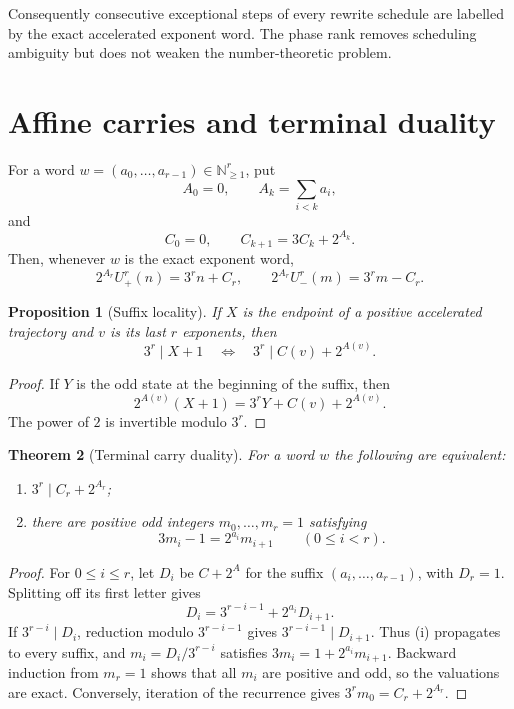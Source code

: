 \documentclass[11pt,reqno]{amsart}
\newtheorem{theorem}{Theorem}[section]
\newtheorem{proposition}[theorem]{Proposition}
\theoremstyle{remark}
\newcommand{\N}{\mathbb N}
\newcommand{\Up}{U_{+}}
\newcommand{\Um}{U_{-}}
\begin{document}
Consequently consecutive exceptional steps of every rewrite schedule are
labelled by the exact accelerated exponent word.  The phase rank removes
scheduling ambiguity but does not weaken the number-theoretic problem.

\section{Affine carries and terminal duality}

For a word $w=(a_0,\ldots,a_{r-1})\in\N_{\ge1}^r$, put
\[
 A_0=0,\qquad A_k=\sum_{i<k}a_i,
\]
and
\[
 C_0=0,\qquad C_{k+1}=3C_k+2^{A_k}.                  \tag{3.1}
\]
Then, whenever $w$ is the exact exponent word,
\[
 2^{A_r}\Up^r(n)=3^rn+C_r,\qquad
 2^{A_r}\Um^r(m)=3^rm-C_r.                           \tag{3.2}
\]

\begin{proposition}[Suffix locality]\label{prop:locality}
If $X$ is the endpoint of a positive accelerated trajectory and $v$ is its
last $r$ exponents, then
\[
 3^r\mid X+1\quad\Longleftrightarrow\quad
 3^r\mid C(v)+2^{A(v)}.
\]
\end{proposition}

\begin{proof}
If $Y$ is the odd state at the beginning of the suffix, then
\[
 2^{A(v)}(X+1)=3^rY+C(v)+2^{A(v)}.
\]
The power of $2$ is invertible modulo $3^r$.
\end{proof}

\begin{theorem}[Terminal carry duality]\label{thm:duality}
For a word $w$ the following are equivalent:
\begin{enumerate}[label=\textup{(\roman*)}]
\item $3^r\mid C_r+2^{A_r}$;
\item there are positive odd integers
$m_0,\ldots,m_r=1$ satisfying
\[
 3m_i-1=2^{a_i}m_{i+1}\qquad(0\le i<r).
\]
\end{enumerate}
\end{theorem}

\begin{proof}
For $0\le i\le r$, let $D_i$ be $C+2^A$ for the suffix
$(a_i,\ldots,a_{r-1})$, with $D_r=1$.  Splitting off its first letter gives
\[
 D_i=3^{r-i-1}+2^{a_i}D_{i+1}.
\]
If $3^{r-i}\mid D_i$, reduction modulo $3^{r-i-1}$ gives
$3^{r-i-1}\mid D_{i+1}$.  Thus (i) propagates to every suffix, and
$m_i=D_i/3^{r-i}$ satisfies
$3m_i=1+2^{a_i}m_{i+1}$.  Backward induction from $m_r=1$ shows that all
$m_i$ are positive and odd, so the valuations are exact.  Conversely,
iteration of the recurrence gives $3^rm_0=C_r+2^{A_r}$.
\end{proof}
\end{document}
